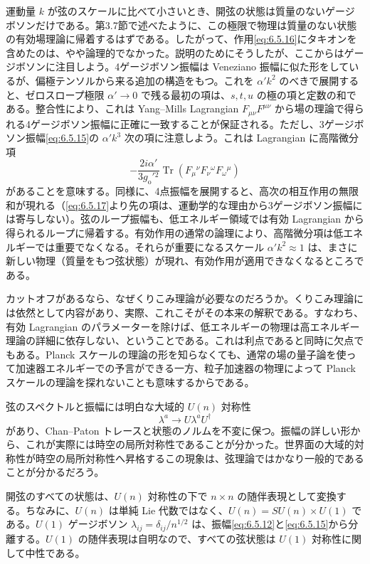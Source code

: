 運動量 $k$ が弦のスケールに比べて小さいとき、開弦の状態は質量のないゲージボソンだけである。第3.7節で述べたように、この極限で物理は質量のない状態の有効場理論に帰着するはずである。したがって、作用\eqref{eq:6.5.16}にタキオンを含めたのは、やや論理的でなかった。説明のためにそうしたが、ここからはゲージボソンに注目しよう。4ゲージボソン振幅は Veneziano 振幅に似た形をしているが、偏極テンソルから来る追加の構造をもつ。これを $\alpha'k^2$ のべきで展開すると、ゼロスロープ極限 $\alpha'\to0$ で残る最初の項は、$s,t,u$ の極の項と定数の和である。整合性により、これは Yang--Mills Lagrangian $F_{\mu\nu}F^{\mu\nu}$ から場の理論で得られる4ゲージボソン振幅に正確に一致することが保証される。ただし、3ゲージボソン振幅\eqref{eq:6.5.15}の $\alpha'k^3$ 次の項に注意しよう。これは Lagrangian に高階微分項
\begin{equation}
-\frac{2i\alpha'}{3g_{\mathrm o}'{}^2}
\operatorname{Tr}(F_\mu{}^\nu F_\nu{}^\omega F_\omega{}^\mu)
\tag{6.5.17}\label{eq:6.5.17}
\end{equation}
があることを意味する。同様に、4点振幅を展開すると、高次の相互作用の無限和が現れる（\eqref{eq:6.5.17}より先の項は、運動学的な理由から3ゲージボソン振幅には寄与しない）。弦のループ振幅も、低エネルギー領域では有効 Lagrangian から得られるループに帰着する。有効作用の通常の論理により、高階微分項は低エネルギーでは重要でなくなる。それらが重要になるスケール $\alpha'k^2\approx1$ は、まさに新しい物理（質量をもつ弦状態）が現れ、有効作用が適用できなくなるところである。

カットオフがあるなら、なぜくりこみ理論が必要なのだろうか。くりこみ理論には依然として内容があり、実際、これこそがその本来の解釈である。すなわち、有効 Lagrangian のパラメーターを除けば、低エネルギーの物理は高エネルギー理論の詳細に依存しない、ということである。これは利点であると同時に欠点でもある。Planck スケールの理論の形を知らなくても、通常の場の量子論を使って加速器エネルギーでの予言ができる一方、粒子加速器の物理によって Planck スケールの理論を探れないことも意味するからである。

弦のスペクトルと振幅には明白な大域的 $U(n)$ 対称性
\begin{equation}
\lambda^a\longrightarrow U\lambda^aU^\dagger
\tag{6.5.18}\label{eq:6.5.18}
\end{equation}
があり、Chan--Paton トレースと状態のノルムを不変に保つ。振幅の詳しい形から、これが実際には時空の局所対称性であることが分かった。世界面の大域的対称性が時空の局所対称性へ昇格するこの現象は、弦理論ではかなり一般的であることが分かるだろう。

開弦のすべての状態は、$U(n)$ 対称性の下で $n\times n$ の随伴表現として変換する。ちなみに、$U(n)$ は単純 Lie 代数ではなく、$U(n)=SU(n)\times U(1)$ である。$U(1)$ ゲージボソン $\lambda_{ij}=\delta_{ij}/n^{1/2}$ は、振幅\eqref{eq:6.5.12}と\eqref{eq:6.5.15}から分離する。$U(1)$ の随伴表現は自明なので、すべての弦状態は $U(1)$ 対称性に関して中性である。

